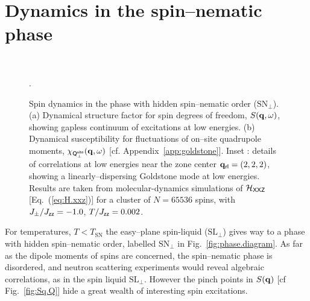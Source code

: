 \documentclass[apsrev4-1,prx,superscriptaddress,floatfix,twocolumn,longbibliography]{revtex4-1}
\begin{document}
\section{Dynamics in the spin--nematic phase}
\label{sec:Qdynamics}


\begin{figure*}
  \centering
    \\
  \caption{
  Spin dynamics in the phase with hidden spin--nematic order ($\text{SN}_\perp$).    
  (a) Dynamical structure factor for spin degrees of freedom, 
  $S({\bf q}, \omega)$, 
  showing gapless continuum of excitations at low energies.   
  (b) Dynamical susceptibility for fluctuations of on--site quadrupole moments, 
  $\chi_{\sf Q_\perp^{\sf site}}({\bf q}, \omega)$ [cf. Appendix~\ref{app:goldstone}].     
  Inset :  details of correlations at low energies 
  near the zone center ${\bf q}_{\sf rl} = (2,2,2)$, showing a linearly--dispersing 
  Goldstone mode at low energies.
  Results are taken from molecular-dynamics simulations of $\mathcal{H}_{\sf XXZ}$ [Eq.~(\ref{eq:H.xxz})] 
  for a cluster of $N=65536$ spins, with $J_\pm/J_{\sf zz} = -1.0$, $T/J_{\sf zz} = 0.002$.}
  \label{fig.predictions.for.dynamics}.
\end{figure*}


For temperatures, $T < T_\text{SN}$ the easy--plane spin-liquid ($\text{SL}_\perp$) 
gives way to a phase with hidden spin--nematic order, 
labelled $\text{SN}_\perp$ in Fig.~\ref{fig:phase.diagram}.   
%
As far as the dipole moments of spins are concerned, the spin--nematic phase is disordered, 
and neutron scattering experiments would reveal algebraic correlations,  
as in the spin liquid $\text{SL}_\perp$. 
%
However the pinch points in $S({\bf q})$ [cf Fig.~\ref{fig:Sq.Q}] 
hide a great wealth of interesting spin excitations.   
\end{document}
